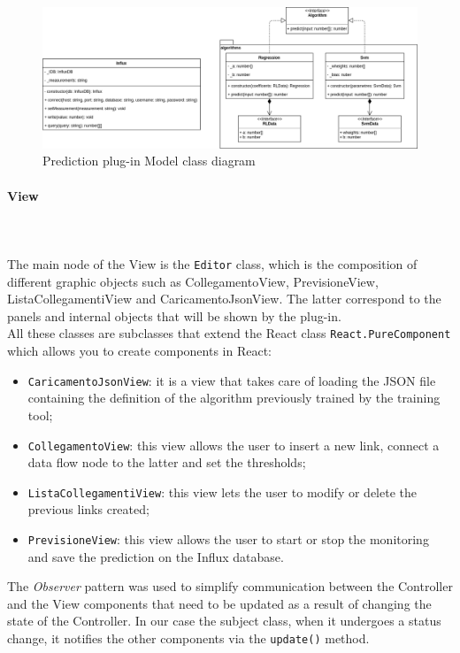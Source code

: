 \begin{figure}[H]
\centering
\includegraphics[scale=0.40]{../../../Diagrams/Classes_diagrams/plugin_model.png}
\caption{Prediction plug-in Model class diagram}
\end{figure}

\paragraph{View}\mbox{} \\ \mbox{} \\
The main node of the View is the \texttt{Editor} class, which is the composition of different graphic objects such as CollegamentoView, PrevisioneView, ListaCollegamentiView and CaricamentoJsonView. The latter correspond to the panels and internal objects that will be shown by the plug-in. \\
All these classes are subclasses that extend the React class \texttt{React.PureComponent} which allows you to create components in React:
\begin{itemize}
\item \texttt{CaricamentoJsonView}: it is a view that takes care of loading the JSON file containing the definition of the algorithm previously trained by the training tool;
\item \texttt{CollegamentoView}: this view allows the user to insert a new link, connect a data flow node to the latter and set the thresholds;
\item \texttt{ListaCollegamentiView}: this view lets the user to modify or delete the previous links created;
\item \texttt{PrevisioneView}: this view allows the user to start or stop the monitoring and save the prediction on the Influx database.
\end{itemize}
The \textit{Observer} pattern was used to simplify communication between the Controller and the View components that need to be updated as a result of changing the state of the Controller. In our case the subject class, when it undergoes a status change, it notifies the other components via the \texttt{update()} method.


